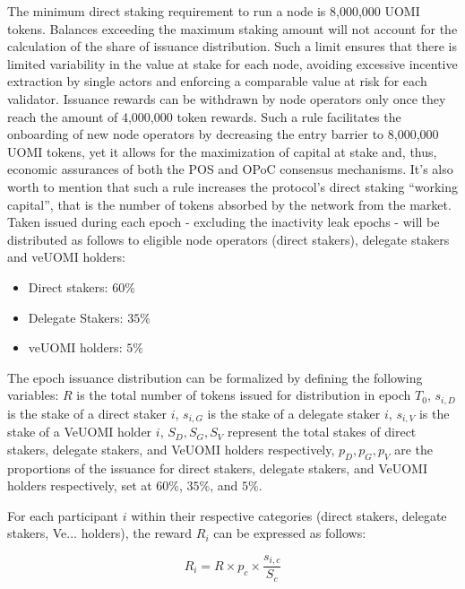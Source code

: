 \documentclass{article}
\begin{document}
The minimum direct staking requirement to run a node is 8,000,000 UOMI tokens. Balances exceeding the maximum staking amount will not account for the calculation of the share of issuance distribution. Such a limit ensures that there is limited variability in the value at stake for each node, avoiding excessive incentive extraction by single actors and enforcing a comparable value at risk for each validator.
Issuance rewards can be withdrawn by node operators only once they reach the amount of 4,000,000 token rewards. Such a rule facilitates the onboarding of new node operators by decreasing the entry barrier to 8,000,000 UOMI tokens, yet it allows for the maximization of capital at stake and, thus, economic assurances of both the POS and OPoC consensus mechanisms. It’s also worth to mention that such a rule increases the protocol’s direct staking “working capital”, that is the number of tokens absorbed by the network from the market.
Taken issued during each epoch - excluding the inactivity leak epochs - will be distributed as follows to eligible node operators (direct stakers), delegate stakers and veUOMI holders:

\begin{itemize}
\item Direct stakers: \(60\% \)
\item Delegate Stakers: \(35\% \)
\item veUOMI holders: \(5\% \)
\end{itemize}

The epoch issuance distribution can be formalized by defining the following variables: 
\( R \) is the total number of tokens issued for distribution in epoch \( T_0 \),
\( s_{i,D} \) is the stake of a direct staker \( i \),
\( s_{i,G} \) is the stake of a delegate staker \( i \),
\( s_{i,V} \) is the stake of a VeUOMI holder \( i \),
\( S_D, S_G, S_V \) represent the total stakes of direct stakers, delegate stakers, and VeUOMI holders respectively,
\( p_D, p_G, p_V \) are the proportions of the issuance for direct stakers, delegate stakers, and VeUOMI holders respectively, set at \(60\%\), \(35\%\), and \(5\%\).


For each participant \( i \) within their respective categories (direct stakers, delegate stakers, Ve... holders), the reward \( R_i \) can be expressed as follows:

\[ R_i = R \times p_c \times \frac{s_{i,c}}{S_c} \]
\end{document}
